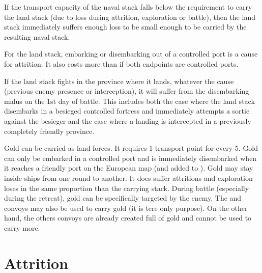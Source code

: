 If the transport capacity of the naval stack falls below the requirement to
carry the land stack (due to loss during attrition, exploration or battle),
then the land stack immediately suffers enough loss to be small enough to be
carried by the resulting naval stack.

For the land stack, embarking or disembarking out of a controlled port is a
cause for attrition. It also costs more \MP than if both endpoints are
controlled ports.

If the land stack fights in the province where it lands, whatever the cause
(previous enemy presence or interception), it will suffer from the
disembarking malus on the 1st day of battle. This includes both the case where
the land stack disembarks in a besieged controlled fortress and immediately
attempts a sortie against the besieger and the case where a landing is
intercepted in a previously completely friendly province.

Gold can be carried as land forces. It requires 1 transport point for every
5\ducats. Gold can only be embarked in a controlled port and is immediately
disembarked when it reaches a friendly port on the European map (and added to
). Gold may stay inside ships from
one round to another. It does suffer attritions and exploration loses in the
same proportion than the carrying stack. During battle (especially during the
retreat), gold can be specifically targeted by the enemy. The  and  convoys may also be used to carry gold (it
is tere only purpose). On the other hand, the others convoys are already
created full of gold and cannot be used to carry more.



\section{Attrition}
\label{chMilitary:Attrition}
